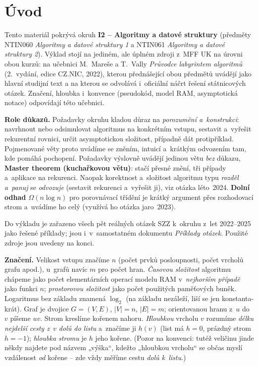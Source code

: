 \documentclass[11pt,a4paper]{article}
\begin{document}
\maketitle
\tableofcontents
\bigskip

\section*{Úvod}

Tento materiál pokrývá okruh \textbf{I2 -- Algoritmy a datové struktury} (předměty NTIN060 \emph{Algoritmy a datové struktury 1} a NTIN061 \emph{Algoritmy a datové struktury 2}). Výklad stojí na jediném, ale úplném zdroji z~MFF UK na úrovni obou kurzů: na učebnici M.~Mareše a T.~Vally \emph{Průvodce labyrintem algoritmů} (2.~vydání, edice CZ.NIC, 2022), kterou přednášející obou předmětů uvádějí jako hlavní studijní text a na kterou se odvolává i~oficiální náčrt řešení státnicových otázek. Značení, hloubka i~konvence (pseudokód, model RAM, asymptotická notace) odpovídají této učebnici.

\noindent\textbf{Role důkazů.} Požadavky okruhu kladou důraz na \emph{porozumění a~konstrukci}: navrhnout nebo odsimulovat algoritmus na konkrétním vstupu, sestavit a~vyřešit rekurentní rovnici, určit asymptotickou složitost, případně dát protipříklad. Pojmenované věty proto uvádíme se zněním, intuicí a~krátkým odvozením tam, kde pomáhá pochopení. Požadavky výslovně uvádějí jedinou větu \emph{bez} důkazu, \textbf{Master theorem (kuchařkovou větu)}: stačí přesné znění, tři případy a~aplikace na rekurenci. Naopak korektnost a~složitost algoritmu typu \emph{rozděl a~panuj} se \emph{odvozuje} (sestavit rekurenci a~vyřešit ji), viz otázka léto~2024. \textbf{Dolní odhad $\Omega(n\log n)$} pro porovnávací třídění je krátký argument přes rozhodovací strom a~uvádíme ho celý (využívá ho otázka jaro~2023).

Do výkladu je zařazeno všech pět reálných otázek SZZ k~okruhu z~let 2022--2025 jako řešené příklady; jsou i~v~samostatném dokumentu \emph{Příklady otázek}. Použité zdroje jsou uvedeny na konci.

\medskip
\noindent\textbf{Značení.} Velikost vstupu značíme $n$ (počet prvků posloupnosti, počet vrcholů grafu apod.), u~grafů navíc $m$ pro počet hran. \emph{Časovou složitost} algoritmu chápeme jako počet elementárních operací modelu RAM v~\emph{nejhorším případě} jako funkci $n$; \emph{prostorovou složitost} jako počet použitých paměťových buněk. Logaritmus bez základu znamená $\log_2$ (na základu nezáleží, liší se jen konstanta-krát). Graf je dvojice $G=(V,E)$, $|V|=n$, $|E|=m$; orientovanou hranu z~$u$ do~$v$ píšeme $uv$. Strom kreslíme kořenem nahoru. \emph{Hloubkou} vrcholu $v$ rozumíme \emph{délku nejdelší cesty z~$v$ dolů do listu} a~značíme ji $h(v)$ (list má $h=0$, prázdný strom $h=-1$); \emph{hloubka stromu} je $h$ jeho kořene. (Pozor na konvenci: tutéž veličinu jinde někdy najdete pod názvem „výška``, kdežto „hloubkou vrcholu`` se občas myslí vzdálenost \emph{od} kořene -- zde vždy měříme cestu \emph{dolů k~listu}.)
\end{document}
